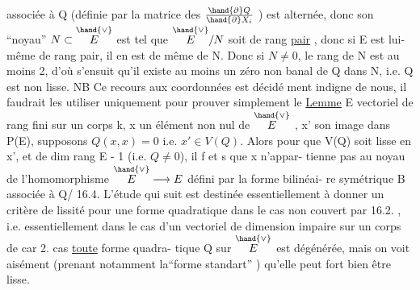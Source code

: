 
associée à Q (définie par la matrice des $\frac{\hand{\partial} Q}{\hand{\partial} X_i}$ ) est alternée, donc son
``noyau''  $N\subset\overset{\hand{\vee}}{E}$  est tel que  $\overset{\hand{\vee}}{E}/N$  soit de rang \uline{pair} , donc si E est lui-%
même de rang pair, il en est de même de N. Donc si $N\neq 0$, le rang de N
est au moins 2, d'où s'ensuit qu'il existe au moins un zéro non banal de
Q dans N, i.e. Q est non lisse.  NB Ce recours aux coordonnées est décidé
ment indigne de nous, il faudrait les utiliser uniquement pour prouver
simplement le
\uline{Lemme}  E vectoriel de rang fini sur un corps k,  x un élément non nul de
$\overset{\hand{\vee}}{E}$ ,  x' son image dans P(E), supposons  $Q(x,x) = 0$ i.e.
$x'\in V(Q)$. Alors pour que  V(Q) soit lisse en x',
et de dim  rang E - 1   (i.e. $Q\neq 0$), il f et s  que x n'appar-%
tienne pas au noyau de l'homomorphisme $\overset{\hand{\vee}}{E}\longrightarrow E$ défini par la forme bilinéai-%
re symétrique B associée à Q/
16.4.  L'étude qui suit est destinée essentiellement à 
donner un critère de lissité pour une forme quadratique dans le cas non
couvert par 16.2. , i.e. essentiellement dans le cas d'un vectoriel de
dimension impaire sur un corps de car 2.  cas \uline{toute} forme quadra-%
tique  Q  sur $\overset{\hand{\vee}}{E}$ est dégénérée, mais on voit aisément (prenant notamment
la``forme standart'' ) qu'elle peut fort bien être lisse.


